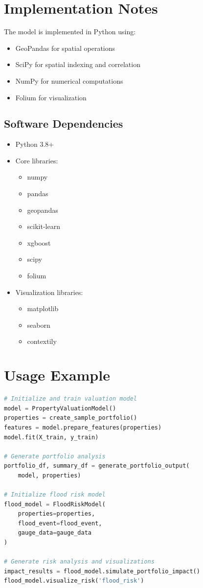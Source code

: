 \documentclass{article}
\begin{document}
\section{Implementation Notes}
The model is implemented in Python using:
\begin{itemize}
    \item GeoPandas for spatial operations
    \item SciPy for spatial indexing and correlation
    \item NumPy for numerical computations
    \item Folium for visualization
\end{itemize}

\subsection{Software Dependencies}
\begin{itemize}
    \item Python 3.8+
    \item Core libraries:
    \begin{itemize}
        \item numpy
        \item pandas
        \item geopandas
        \item scikit-learn
        \item xgboost
        \item scipy
        \item folium
    \end{itemize}
    \item Visualization libraries:
    \begin{itemize}
        \item matplotlib
        \item seaborn
        \item contextily
    \end{itemize}
\end{itemize}

\section{Usage Example}
\begin{lstlisting}[language=Python]
# Initialize and train valuation model
model = PropertyValuationModel()
properties = create_sample_portfolio()
features = model.prepare_features(properties)
model.fit(X_train, y_train)

# Generate portfolio analysis
portfolio_df, summary_df = generate_portfolio_output(
    model, properties)

# Initialize flood risk model
flood_model = FloodRiskModel(
    properties=properties,
    flood_event=flood_event,
    gauge_data=gauge_data
)

# Generate risk analysis and visualizations
impact_results = flood_model.simulate_portfolio_impact()
flood_model.visualize_risk('flood_risk')
\end{lstlisting}
\end{document}
